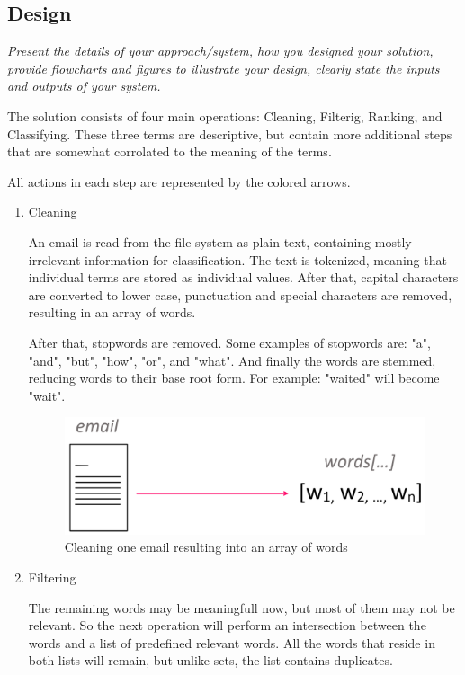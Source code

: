 \documentclass[journal]{IEEEtran}
\begin{document}
\subsection{Design}
\textit{Present the details of your approach/system, how you designed your solution, provide flowcharts and figures to illustrate your design, clearly state the inputs and outputs of your system.}

The solution consists of four main operations: Cleaning, Filterig, Ranking, and Classifying. These three terms are descriptive, but contain more additional steps that are somewhat corrolated to the meaning of the terms.

All actions in each step are represented by the colored arrows.

\begin{enumerate}
    \item Cleaning

    An email is read from the file system as plain text, containing mostly irrelevant information for classification. The text is tokenized, meaning that individual terms are stored as individual values. After that, capital characters are converted to lower case, punctuation and special characters are removed, resulting in an array of words.

    After that, stopwords are removed. Some examples of stopwords are: "a", "and", "but", "how", "or", and "what". And finally the words are stemmed, reducing words to their base root form. For example: "waited" will become "wait".

    \begin{figure}[ht!]
        \centering
        \includegraphics[width=.6\linewidth]{res/cleaning}
        \caption{Cleaning one email resulting into an array of words}
        \label{fig:sub1}
    \end{figure}

    \item Filtering

    The remaining words may be meaningfull now, but most of them may not be relevant. So the next operation will perform an intersection between the words and a list of predefined relevant words. All the words that reside in both lists will remain, but unlike sets, the list contains duplicates.


\end{enumerate}
\end{document}
